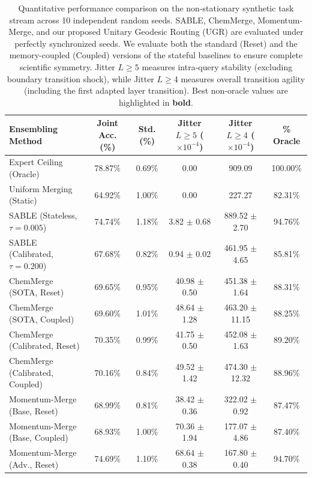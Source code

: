 \begin{table}[t]
\caption{Quantitative performance comparison on the non-stationary synthetic task stream across 10 independent random seeds. SABLE, ChemMerge, Momentum-Merge, and our proposed Unitary Geodesic Routing (UGR) are evaluated under perfectly synchronized seeds. We evaluate both the standard (Reset) and the memory-coupled (Coupled) versions of the stateful baselines to ensure complete scientific symmetry. Jitter $L \ge 5$ measures intra-query stability (excluding boundary transition shock), while Jitter $L \ge 4$ measures overall transition agility (including the first adapted layer transition). Best non-oracle values are highlighted in \textbf{bold}.}
\label{tab:main_results}
\vskip 0.15in
\begin{center}
\begin{small}
\begin{sc}
\setlength{\tabcolsep}{1.8pt}
\begin{tabular}{lccccc}
\toprule
Ensembling Method & Joint Acc. (\%) & Std. (\%) & Jitter $L \ge 5$ ($\times 10^{-4}$) & Jitter $L \ge 4$ ($\times 10^{-4}$) & \% Oracle \\
\midrule
Expert Ceiling (Oracle) & 78.87\% & 0.69\% & 0.00 & 909.09 & 100.00\% \\
Uniform Merging (Static) & 64.92\% & 1.00\% & 0.00 & 227.27 & 82.31\% \\
\midrule
SABLE (Stateless, $\tau = 0.005$) & 74.74\% & 1.18\% & 3.82 $\pm$ 0.68 & 889.52 $\pm$ 2.70 & 94.76\% \\
SABLE (Calibrated, $\tau = 0.200$) & 67.68\% & 0.82\% & 0.94 $\pm$ 0.02 & 461.95 $\pm$ 4.65 & 85.81\% \\
\midrule
ChemMerge (SOTA, Reset) & 69.65\% & 0.95\% & 40.98 $\pm$ 0.50 & 451.38 $\pm$ 1.64 & 88.31\% \\
ChemMerge (SOTA, Coupled) & 69.60\% & 1.01\% & 48.64 $\pm$ 1.28 & 463.20 $\pm$ 11.15 & 88.25\% \\
ChemMerge (Calibrated, Reset) & 70.35\% & 0.99\% & 41.75 $\pm$ 0.50 & 452.08 $\pm$ 1.63 & 89.20\% \\
ChemMerge (Calibrated, Coupled) & 70.16\% & 0.84\% & 49.52 $\pm$ 1.42 & 474.30 $\pm$ 12.32 & 88.96\% \\
\midrule
Momentum-Merge (Base, Reset) & 68.99\% & 0.81\% & 38.42 $\pm$ 0.36 & 322.02 $\pm$ 0.92 & 87.47\% \\
Momentum-Merge (Base, Coupled) & 68.93\% & 1.00\% & 70.36 $\pm$ 1.94 & 177.07 $\pm$ 4.86 & 87.40\% \\
Momentum-Merge (Adv., Reset) & 74.69\% & 1.10\% & 68.64 $\pm$ 0.38 & 167.80 $\pm$ 0.40 & 94.70\% \\

\end{tabular}
\end{sc}
\end{small}
\end{center}
\end{table}
